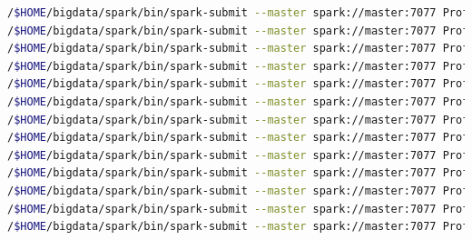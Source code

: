 \begin{lstlisting}[label=sprofdaydis,language=sh,frame=single,caption=Script onas que más beneficios proporcionarían al taxista con estacionalidad en modo distribuido]
/$HOME/bigdata/spark/bin/spark-submit --master spark://master:7077 ProfitableAreasDay.py mil.parquet martes 01-01 11:00
/$HOME/bigdata/spark/bin/spark-submit --master spark://master:7077 ProfitableAreasDay.py quinientos.parquet martes 01-01 11:00
/$HOME/bigdata/spark/bin/spark-submit --master spark://master:7077 ProfitableAreasDay.py cinquenta.parquet martes 01-01 11:00
/$HOME/bigdata/spark/bin/spark-submit --master spark://master:7077 ProfitableAreasDay.py 1decimo.parquet martes 01-01 11:00
/$HOME/bigdata/spark/bin/spark-submit --master spark://master:7077 ProfitableAreasDay.py 2decimo.parquet martes 01-01 11:00
/$HOME/bigdata/spark/bin/spark-submit --master spark://master:7077 ProfitableAreasDay.py 3decimo.parquet martes 01-01 11:00
/$HOME/bigdata/spark/bin/spark-submit --master spark://master:7077 ProfitableAreasDay.py 4decimo.parquet martes 01-01 11:00
/$HOME/bigdata/spark/bin/spark-submit --master spark://master:7077 ProfitableAreasDay.py half.parquet martes 01-01 11:00
/$HOME/bigdata/spark/bin/spark-submit --master spark://master:7077 ProfitableAreasDay.py 6decimo.parquet martes 01-01 11:00
/$HOME/bigdata/spark/bin/spark-submit --master spark://master:7077 ProfitableAreasDay.py 7decimo.parquet martes 01-01 11:00
/$HOME/bigdata/spark/bin/spark-submit --master spark://master:7077 ProfitableAreasDay.py 8decimo.parquet martes 01-01 11:00
/$HOME/bigdata/spark/bin/spark-submit --master spark://master:7077 ProfitableAreasDay.py 9decimo.parquet martes 01-01 11:00
/$HOME/bigdata/spark/bin/spark-submit --master spark://master:7077 ProfitableAreasDay.py full.parquet martes 01-01 11:00
\end{lstlisting}
